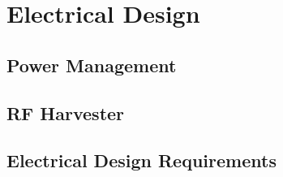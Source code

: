 

\setcounter{section}{4}
\section{Electrical Design}
\bigskip


\subsection{Power Management}

\pagebreak
\subsection{RF Harvester}




\pagebreak
\subsection{Electrical Design Requirements}
